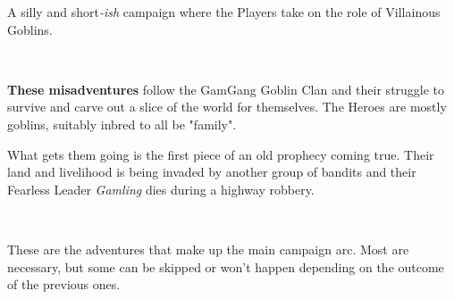 A silly and short\emph{-ish} campaign where the Players take on the role of Villainous Goblins.

\

\textbf{These misadventures} follow the GamGang Goblin Clan and their struggle to survive and carve out a slice of the world for themselves. The Heroes are mostly goblins, suitably inbred to all be "family".

What gets them going is the first piece of an old prophecy coming true. Their land and livelihood is being invaded by another group of bandits and their Fearless Leader \emph{Gamling} dies during a highway robbery.

\

\tableofcontents                           %

\vspace{4\baselineskip}


These are the adventures that make up the main campaign arc. Most are necessary, but some can be skipped or won't happen depending on the outcome of the previous ones.

